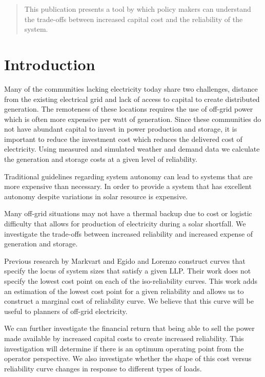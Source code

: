 \documentclass{article}
\begin{document}
\newcommand{\unit}[1]{\ensuremath{\, \mathrm{#1}}}
\begin{abstract}
This publication presents a tool by which policy makers can
understand the trade-offs between increased capital cost and the
reliability of the system.
\end{abstract}

\section{Introduction}
Many of the communities lacking electricity today share two challenges,
distance from the existing electrical grid and lack of access to capital
to create distributed generation.
The remoteness of these locations requires the use of off-grid power
which is often more expensive per watt of generation.
Since these communities do not have abundant capital to invest in power
production and storage, it is important to reduce the investment cost
which reduces the delivered cost of electricity.
Using measured and simulated weather and demand data we calculate the
generation and storage costs at a given level of reliability.


Traditional guidelines regarding system autonomy can lead to systems
that are more expensive than necessary.
In order to provide a system that has excellent autonomy despite
variations in solar resource is expensive.

Many off-grid situations may not have a thermal backup due to cost or
logistic difficulty that allows for production of electricity during a
solar shortfall.
We investigate the trade-offs between increased reliability and
increased expense of generation and storage.

Previous research by Markvart and Egido and Lorenzo construct curves
that specify the locus of system sizes that satisfy a given LLP.
Their work does not specify the lowest cost point on each of the
iso-reliability curves.
This work adds an estimation of the lowest cost point for a given
reliability and allows us to construct a marginal cost of reliability
curve.
We believe that this curve will be useful to planners of off-grid
electricity.

We can further investigate the financial return that being able to sell
the power made available by increased capital costs to create increased
reliability.
This investigation will determine if there is an optimum operating point
from the operator perspective.
We also investigate whether the shape of this cost versus reliability
curve changes in response to different types of loads.
\end{document}
